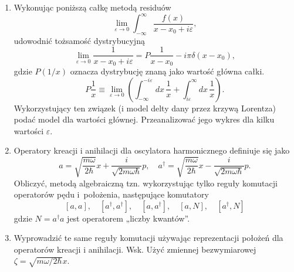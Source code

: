 \documentclass[a4paper,11pt]{article}
\begin{document}
\begin{enumerate}
\item Wykonując poniższą całkę metodą residuów
  \begin{equation}
    \label{QM:27}
    \lim_{ \varepsilon \to 0 } \int_{ -\infty }^{ \infty } \frac{ f( x ) }{ x - x_{ 0 } + i \varepsilon },
  \end{equation}
  udowodnić tożsamość dystrybucyjną
  \begin{equation}
    \label{QM:28}
    \lim_{ \varepsilon \to 0 } \frac{ 1 }{ x - x_{ 0 } + i \varepsilon } =
    P \frac{ 1 }{ x - x_{ 0 } } - i \pi \delta( x - x_{ 0 } ),
  \end{equation}
  gdzie $P( 1 / x )$ oznacza dystrybucję znaną jako wartość główna
  całki.
  \begin{equation}
    \label{QM:29}
    P \frac{ 1 }{ x } \equiv
    \lim_{ \varepsilon \to 0 } \left( \int_{ -\infty }^{ -i \varepsilon } dx \, \frac{ 1 }{ x }
      + \int_{ i \varepsilon }^{ \infty } dx \, \frac{ 1 }{ x } \right).
  \end{equation}
  Wykorzystujący ten związek (i model delty dany przez krzywą
  Lorentza) podać model dla wartości głównej. Przeanalizować jego
  wykres dla kilku wartości $\varepsilon$.



\item Operatory kreacji i anihilacji dla oscylatora harmonicznego
  definiuje się jako
  \begin{equation}
    \label{QM:30}
    a =
    \sqrt{ \frac{ m \omega }{ 2 \hbar } } x
    + \frac{ i }{ \sqrt{ 2 m \omega \hbar } } p, \quad
    a^{ \dagger } =
    \sqrt{ \frac{ m \omega }{ 2 \hbar } } x
    - \frac{ i }{ \sqrt{ 2 m \omega \hbar } } p.
  \end{equation}
  Obliczyć, metodą algebraiczną tzn. wykorzystując tylko reguły
  komutacji operatorów pędu i~położenia, następujące komutatory
  \begin{equation}
    \label{QM:31}
    [ a, a ], \quad [ a^{ \dagger }, a^{ \dagger } ], \quad [ a, a^{ \dagger } ], \quad
    [ a, N ], \quad [ a^{ \dagger }, N ]
  \end{equation}
  gdzie $N = a^{ \dagger } a$ jest operatorem „liczby kwantów”.



\item Wyprowadzić te same reguły komutacji używając reprezentacji
  położeń dla operatorów kreacji i anihilacji. Wsk. Użyć zmiennej
  bezwymiarowej $\zeta = \sqrt{ m \omega / 2 \hbar } x$.




\end{enumerate}
\end{document}
